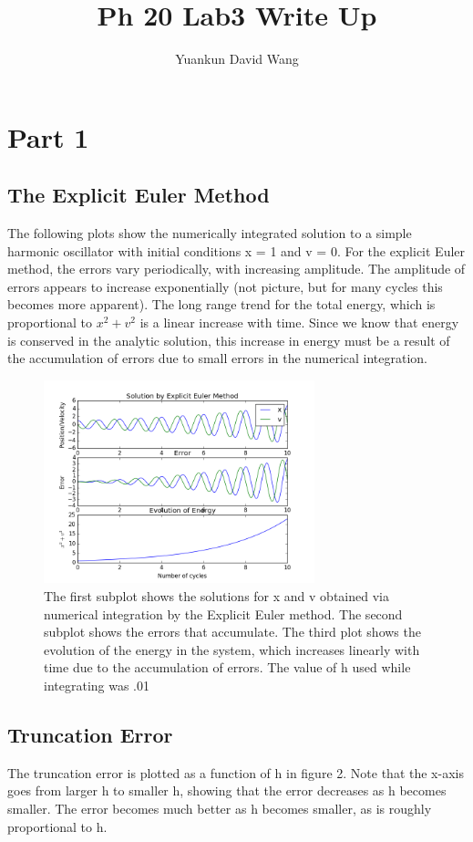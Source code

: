 \documentclass[a4paper]{article}
\title{Ph 20 Lab3 Write Up}
\author{Yuankun David Wang}
\begin{document}
\maketitle


\section{Part 1}
\subsection{The Explicit Euler Method}
The following plots show the numerically integrated solution to a simple harmonic oscillator with initial conditions x = 1 and v = 0. 
For the explicit Euler method, the errors vary periodically, with increasing amplitude. The amplitude of errors appears to increase exponentially (not picture, but for many cycles this becomes more apparent). The long range trend for the total energy, which is proportional to $x^2 + v^2$ is a linear increase with time. Since we know that energy is conserved in the analytic solution, this increase in energy must be a result of the accumulation of errors due to small errors in the numerical integration.

\begin{figure}[H]
\centering
\includegraphics[width=0.7\textwidth]{expl.png}
\caption{\label{fig:expl}The first subplot shows the solutions for x and v obtained via numerical integration by the Explicit Euler method. The second subplot shows the errors that accumulate. The third plot shows the evolution of the energy in the system, which increases linearly with time due to the accumulation of errors. The value of h used while integrating was .01}
\end{figure}

\subsection{Truncation Error}
The truncation error is plotted as a function of h in figure 2. Note that the x-axis goes from larger h to smaller h, showing that the error decreases as h becomes smaller. The error becomes much better as h becomes smaller, as is roughly proportional to h.
\end{document}
